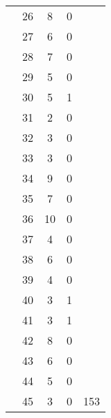 \begin{tabular}{ccccc}
    & 26   & 8    & 0   &      \\
    & 27   & 6    & 0   &      \\
    & 28   & 7    & 0   &      \\
    & 29   & 5    & 0   &      \\
    & 30   & 5    & 1   &      \\
    & 31   & 2    & 0   &      \\
    & 32   & 3    & 0   &      \\
    & 33   & 3    & 0   &      \\
    & 34   & 9    & 0   &      \\
    & 35   & 7    & 0   &      \\
    & 36   & 10   & 0   &      \\
    & 37   & 4    & 0   &      \\
    & 38   & 6    & 0   &      \\
    & 39   & 4    & 0   &      \\
    & 40   & 3    & 1   &      \\
    & 41   & 3    & 1   &      \\
    & 42   & 8    & 0   &      \\
    & 43   & 6    & 0   &      \\
    & 44   & 5    & 0   &      \\
    & 45   & 3    & 0   & 153  \\
\bottomrule
\end{tabular}